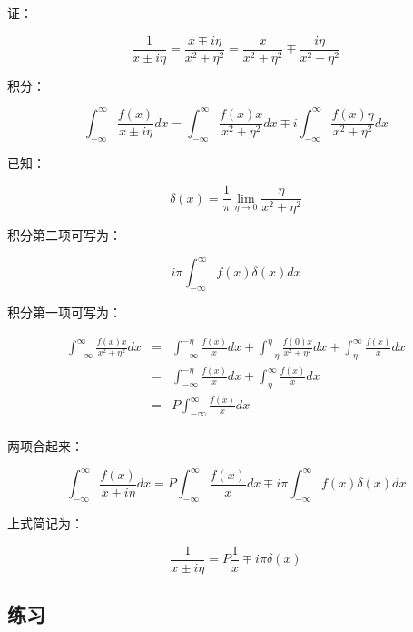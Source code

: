 证：

\begin{equation*}
\frac{1}{ x \pm i \eta} = \frac{x \mp i \eta}{ x^2 + \eta^2 } = \frac{x}{x^2 + \eta^2 } \mp \frac{i \eta}{x^2 + \eta^2 }
\end{equation*}

积分：

\begin{equation*}
\int_{-\infty}^\infty \frac{f(x)}{x \pm i \eta} dx = \int_{-\infty}^\infty \frac{f(x) x}{x^2 + \eta^2} dx \mp i \int_{-\infty}^\infty \frac{f(x) \eta}{ x^2 + \eta^2} dx
\end{equation*}

已知：

\begin{equation}
\delta(x) = \frac{1}{\pi} \lim\limits_{\eta \to 0} \frac{\eta}{x^2 + \eta^2}
\end{equation}

积分第二项可写为：

\begin{equation*}
i \pi \int_{-\infty}^\infty f(x) \delta(x) dx
\end{equation*}

积分第一项可写为：

\begin{eqnarray*}
\int_{-\infty}^\infty \frac{f(x) x}{x^2 + \eta^2} dx &=& \int_{-\infty}^{-\eta} \frac{f(x)}{x} dx +  \int_{-\eta}^{\eta}  \frac{f(0) x}{x^2 + \eta^2} dx + \int_\eta^{\infty} \frac{f(x)}{x} dx\\
{}&=& \int_{-\infty}^{-\eta} \frac{f(x)}{x} dx + \int_\eta^{\infty} \frac{f(x)}{x} dx\\
{} &=& P \int_{-\infty}^\infty  \frac{f(x)}{x} dx \\
\end{eqnarray*}

两项合起来：

\begin{equation}
\int_{-\infty}^\infty \frac{f(x)}{x \pm i \eta} dx  = P \int_{-\infty}^\infty  \frac{f(x)}{x} dx  \mp i \pi \int_{-\infty}^\infty f(x) \delta(x) dx
\end{equation}

上式简记为：

\begin{equation*}
\frac{1}{x \pm i \eta} = P \frac{1}{x} \mp i \pi \delta (x)
\end{equation*}



\subsection*{练习}

